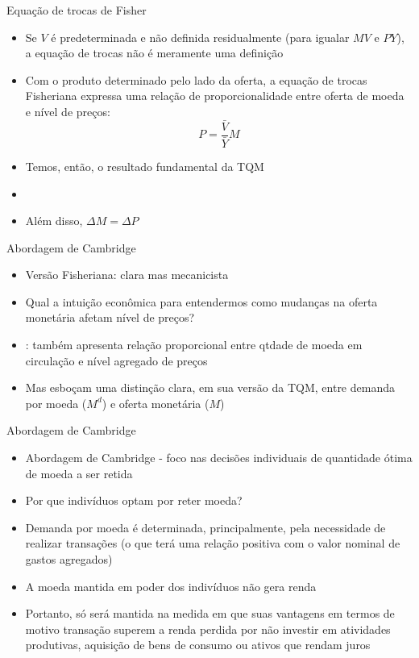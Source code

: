 \documentclass[10pt]{beamer}
\begin{document}
\begin{frame}
    {Equação de trocas de Fisher}
    \begin{itemize}
        \item Se $V$ é predeterminada e não definida residualmente (para igualar $MV$ e $PY$), a equação de trocas não é meramente uma definição\bigskip
        \item Com o produto determinado pelo lado da oferta, a equação de trocas Fisheriana expressa uma relação de proporcionalidade entre oferta de moeda e nível de preços:
        \begin{equation}
            P = \frac{\bar{V}}{\bar{Y}}M
            \label{aula3_eq6}
        \end{equation}
        \item Temos, então, o resultado fundamental da TQM\bigskip
        \item {}\bigskip
        \item Além disso, $\Delta M = \Delta P$
    \end{itemize}
\end{frame}

\begin{frame}
    {Abordagem de Cambridge}
    \begin{itemize}
        \item Versão Fisheriana: clara mas mecanicista\bigskip
        \item Qual a intuição econômica para entendermos como mudanças na oferta monetária afetam nível de preços?\bigskip
        \item {}: também apresenta relação proporcional entre qtdade de moeda em circulação e nível agregado de preços\bigskip
        \item Mas esboçam uma distinção clara, em sua versão da TQM, entre demanda por moeda ($M^d$) e oferta monetária ($M$)
    \end{itemize}
\end{frame}

\begin{frame}
    {Abordagem de Cambridge}
    \begin{itemize}
        \item Abordagem de Cambridge - foco nas decisões individuais de quantidade ótima de moeda a ser retida\bigskip
        \item Por que indivíduos optam por reter moeda?\bigskip
        \item Demanda por moeda é determinada, principalmente, pela necessidade de realizar transações (o que terá uma relação positiva com o valor nominal de gastos agregados)\bigskip
        \item A moeda mantida em poder dos indivíduos não gera renda\bigskip
        \item Portanto, só será mantida na medida em que suas vantagens em termos de motivo transação superem a renda perdida por não investir em atividades produtivas, aquisição de bens de consumo ou ativos que rendam juros
    \end{itemize}
\end{frame}
\end{document}

